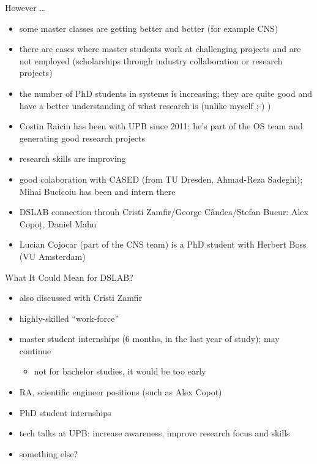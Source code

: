 \documentclass{beamer}
\begin{document}
\begin{frame}{However \ldots}
  \begin{itemize}
    \pause \item some master classes are getting better and better (for
      example CNS)
    \pause \item there are cases where master students work at challenging
      projects and are not employed (scholarships through industry
      collaboration or research projects)
    \pause \item the number of PhD students in systems is increasing; they are
      quite good and have a better understanding of what research is (unlike
      myself ;-) )
    \pause \item Costin Raiciu has been with UPB since 2011; he's part of the
      OS team and generating good research projects
    \pause \item research skills are improving
    \pause \item good colaboration with CASED (from TU Dresden, Ahmad-Reza
      Sadeghi); Mihai Bucicoiu has been and intern there
    \pause \item DSLAB connection throuh Cristi Zamfir/George Cândea/Ștefan
      Bucur: Alex Copoț, Daniel Mahu
    \pause \item Lucian Cojocar (part of the CNS team) is a PhD student with
      Herbert Boss (VU Amsterdam)
  \end{itemize}
\end{frame}

\begin{frame}{What It Could Mean for DSLAB?}
  \begin{itemize}
    \pause \item also discussed with Cristi Zamfir
    \pause \item highly-skilled ``work-force''
    \pause \item master student internships (6 months, in the last year of
      study); may continue
      \begin{itemize}
        \item not for bachelor studies, it would be too early
      \end{itemize}
    \pause \item RA, scientific engineer positions (such as Alex Copoț)
    \pause \item PhD student internships
    \pause \item tech talks at UPB: increase awareness, improve research focus
      and skills
    \pause \item something else?
  \end{itemize}
\end{frame}
\end{document}
